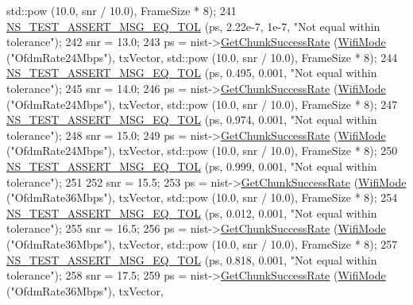 \begin{DoxyCode}
      std::pow (10.0, snr / 10.0), FrameSize * 8);
241   \hyperlink{group__testing_ga9e7861b56b4e70db3b56044cb7a28e41}{NS\_TEST\_ASSERT\_MSG\_EQ\_TOL} (ps, 2.22e-7, 1e-7, \textcolor{stringliteral}{"Not equal within tolerance"});
242   snr = 13.0;
243   ps = nist->\hyperlink{classns3_1_1NistErrorRateModel_a2316a2c287485d7cc81198c90b246bc0}{GetChunkSuccessRate} (\hyperlink{classns3_1_1WifiMode}{WifiMode} (\textcolor{stringliteral}{"OfdmRate24Mbps"}), txVector, 
      std::pow (10.0, snr / 10.0), FrameSize * 8);
244   \hyperlink{group__testing_ga9e7861b56b4e70db3b56044cb7a28e41}{NS\_TEST\_ASSERT\_MSG\_EQ\_TOL} (ps, 0.495, 0.001, \textcolor{stringliteral}{"Not equal within tolerance"});
245   snr = 14.0;
246   ps = nist->\hyperlink{classns3_1_1NistErrorRateModel_a2316a2c287485d7cc81198c90b246bc0}{GetChunkSuccessRate} (\hyperlink{classns3_1_1WifiMode}{WifiMode} (\textcolor{stringliteral}{"OfdmRate24Mbps"}), txVector, 
      std::pow (10.0, snr / 10.0), FrameSize * 8);
247   \hyperlink{group__testing_ga9e7861b56b4e70db3b56044cb7a28e41}{NS\_TEST\_ASSERT\_MSG\_EQ\_TOL} (ps, 0.974, 0.001, \textcolor{stringliteral}{"Not equal within tolerance"});
248   snr = 15.0;
249   ps = nist->\hyperlink{classns3_1_1NistErrorRateModel_a2316a2c287485d7cc81198c90b246bc0}{GetChunkSuccessRate} (\hyperlink{classns3_1_1WifiMode}{WifiMode} (\textcolor{stringliteral}{"OfdmRate24Mbps"}), txVector, 
      std::pow (10.0, snr / 10.0), FrameSize * 8);
250   \hyperlink{group__testing_ga9e7861b56b4e70db3b56044cb7a28e41}{NS\_TEST\_ASSERT\_MSG\_EQ\_TOL} (ps, 0.999, 0.001, \textcolor{stringliteral}{"Not equal within tolerance"});
251 
252   snr = 15.5;
253   ps = nist->\hyperlink{classns3_1_1NistErrorRateModel_a2316a2c287485d7cc81198c90b246bc0}{GetChunkSuccessRate} (\hyperlink{classns3_1_1WifiMode}{WifiMode} (\textcolor{stringliteral}{"OfdmRate36Mbps"}), txVector, 
      std::pow (10.0, snr / 10.0), FrameSize * 8);
254   \hyperlink{group__testing_ga9e7861b56b4e70db3b56044cb7a28e41}{NS\_TEST\_ASSERT\_MSG\_EQ\_TOL} (ps, 0.012, 0.001, \textcolor{stringliteral}{"Not equal within tolerance"});
255   snr = 16.5;
256   ps = nist->\hyperlink{classns3_1_1NistErrorRateModel_a2316a2c287485d7cc81198c90b246bc0}{GetChunkSuccessRate} (\hyperlink{classns3_1_1WifiMode}{WifiMode} (\textcolor{stringliteral}{"OfdmRate36Mbps"}), txVector, 
      std::pow (10.0, snr / 10.0), FrameSize * 8);
257   \hyperlink{group__testing_ga9e7861b56b4e70db3b56044cb7a28e41}{NS\_TEST\_ASSERT\_MSG\_EQ\_TOL} (ps, 0.818, 0.001, \textcolor{stringliteral}{"Not equal within tolerance"});
258   snr = 17.5;
259   ps = nist->\hyperlink{classns3_1_1NistErrorRateModel_a2316a2c287485d7cc81198c90b246bc0}{GetChunkSuccessRate} (\hyperlink{classns3_1_1WifiMode}{WifiMode} (\textcolor{stringliteral}{"OfdmRate36Mbps"}), txVector, 

\end{DoxyCode}
